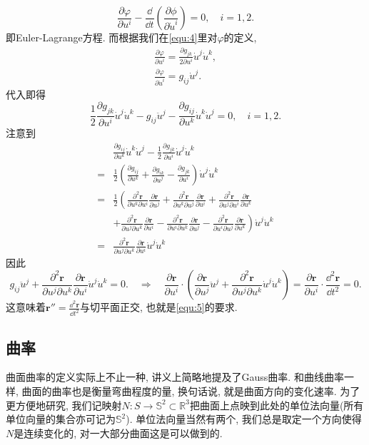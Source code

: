 \documentclass[./main.tex]{subfiles}
\begin{document}
\[
    \frac{\partial\varphi}{\partial u^i}-\frac{\dd}{\dd t}\left(\frac{\partial\phi}{\partial\dot u^i}\right)=0,\quad i=1,2.
\]
即Euler-Lagrange方程. 而根据我们在\eqref{equ:4}里对\(\varphi\)的定义,
\begin{gather*}
    \frac{\partial\varphi}{\partial u^i}=\frac{\partial g_{jk}}{2\partial u^i}\dot u^j\dot u^k,\\
    \frac{\partial\varphi}{\partial\dot u^i}=g_{ij}\dot u^j.
\end{gather*}
代入即得
\[
    \frac12\frac{\partial g_{jk}}{\partial u^i}\dot u^j\dot u^k-g_{ij}\ddot u^j-\frac{\partial g_{ij}}{\partial u^k}\dot u^k\dot u^j=0,\quad i=1,2.
\]
注意到
\begin{align*}
    &\frac{\partial g_{ij}}{\partial u^k}\dot u^k\dot u^j-\frac12\frac{\partial g_{jk}}{\partial u^i}\dot u^j\dot u^k\\
    =&\frac{1}{2}\left(\frac{\partial g_{ij}}{\partial u^k}+\frac{\partial g_{ik}}{\partial u^j}-\frac{\partial g_{jk}}{\partial u^i}\right)\dot u^j\dot u^k\\
    =&\frac{1}{2}\left(\frac{\partial^2\mathbf{r}}{\partial u^k\partial u^i}\frac{\partial\mathbf{r}}{\partial u^j}+\frac{\partial^2\mathbf{r}}{\partial u^k\partial u^j}\frac{\partial\mathbf{r}}{\partial u^i}+\frac{\partial^2\mathbf{r}}{\partial u^j\partial u^i}\frac{\partial\mathbf{r}}{\partial u^k}\right.\\
     &+\left.\frac{\partial^2\mathbf{r}}{\partial u^j\partial u^k}\frac{\partial\mathbf{r}}{\partial u^i}-\frac{\partial^2\mathbf{r}}{\partial u^i\partial u^k}\frac{\partial\mathbf{r}}{\partial u^j}-\frac{\partial^2\mathbf{r}}{\partial u^i\partial u^j}\frac{\partial\mathbf{r}}{\partial u^k}\right)\dot u^j\dot u^k\\
    =&\frac{\partial^2\mathbf{r}}{\partial u^j\partial u^k}\frac{\partial\mathbf{r}}{\partial u^i}\dot u^j\dot u^k
\end{align*}
因此
\[
    g_{ij}\ddot u^j+\frac{\partial^2\mathbf{r}}{\partial u^j\partial u^k}\frac{\partial\mathbf{r}}{\partial u^i}\dot u^j\dot u^k=0.\quad \Longrightarrow\quad\frac{\partial\mathbf{r}}{\partial u^i}\cdot\left(\frac{\partial\mathbf{r}}{\partial u^j}\ddot u^j+\frac{\partial^2\mathbf{r}}{\partial u^j\partial u^k}\dot u^j\dot u^k\right)=\frac{\partial\mathbf{r}}{\partial u^i}\cdot\frac{\dd^2\mathbf{r}}{\dd t^2}=0.
\]
这意味着\(\mathbf{r}''=\frac{\dd^2\mathbf{r}}{\dd t^2}\)与切平面正交, 也就是\eqref{equ:5}的要求.
\subsection{曲率}
曲面曲率的定义实际上不止一种, 讲义上简略地提及了Gauss曲率. 和曲线曲率一样, 曲面的曲率也是衡量弯曲程度的量, 换句话说, 就是曲面方向的变化速率. 为了更方便地研究, 我们记映射\(N:S\to\mathbb{S}^2\subset\mathbb{R}^3\)把曲面上点映到此处的单位法向量(所有单位向量的集合亦可记为\(\mathbb{S}^2\)). 单位法向量当然有两个, 我们总是取定一个方向使得\(N\)是连续变化的, 对一大部分曲面这是可以做到的. 
\end{document}
